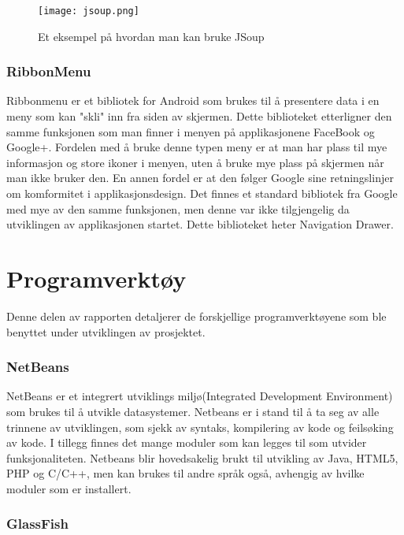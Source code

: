 \documentclass[../main.tex]{subfiles}
\begin{document}
\begin{figure}[H]
  \centering
  \texttt{[image: jsoup.png]}
  \caption{Et eksempel på hvordan man kan bruke JSoup}
\end{figure}

\subsubsection{RibbonMenu}

Ribbonmenu er et bibliotek for Android som brukes til å presentere data i en meny som kan "skli" inn fra siden av skjermen. Dette biblioteket etterligner den samme funksjonen som man finner i menyen på applikasjonene FaceBook og Google+. Fordelen med å bruke denne typen meny er at man har plass til mye informasjon og store ikoner i menyen, uten å bruke mye plass på skjermen når man ikke bruker den. En annen fordel er at den følger Google sine retningslinjer om komformitet i applikasjonsdesign. Det finnes et standard bibliotek fra Google med mye av den samme funksjonen, men denne var ikke tilgjengelig da utviklingen av applikasjonen startet. Dette biblioteket heter Navigation Drawer.

\section{Programverktøy}

Denne delen av rapporten detaljerer de forskjellige programverktøyene som ble benyttet under utviklingen av prosjektet.

\subsubsection{NetBeans}

NetBeans er et integrert utviklings miljø(Integrated Development Environment) som brukes til å utvikle datasystemer. Netbeans er i stand til å ta seg av alle trinnene av utviklingen, som sjekk av syntaks, kompilering av kode og feilsøking av kode. I tillegg finnes det mange moduler som kan legges til som utvider funksjonaliteten. Netbeans blir hovedsakelig brukt til utvikling av Java, HTML5, PHP og C/C++, men kan brukes til andre språk også, avhengig av hvilke moduler som er installert. 

\subsubsection{GlassFish}
\end{document}
